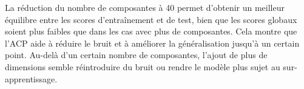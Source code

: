 \documentclass{article}
\begin{document}
\hspace{7pt} La réduction du nombre de composantes à 40 permet d'obtenir un meilleur équilibre entre les scores d'entraînement et de test, bien que les scores globaux soient plus faibles que dans les cas avec plus de composantes. Cela montre que l'ACP aide à réduire le bruit et à améliorer la généralisation jusqu'à un certain point. Au-delà d'un certain nombre de composantes, l'ajout de plus de dimensions semble réintroduire du bruit ou rendre le modèle plus sujet au sur-apprentissage.
\end{document}
